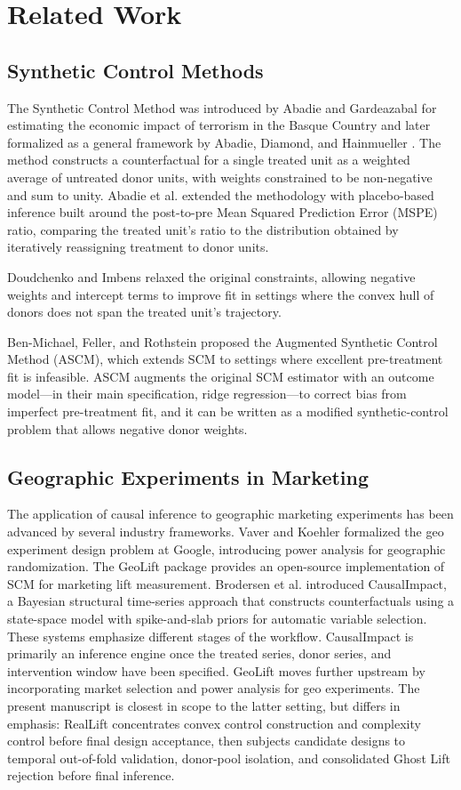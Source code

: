 \documentclass[11pt]{article}
\begin{document}
\section{Related Work}
\subsection{Synthetic Control Methods}
The Synthetic Control Method was introduced by Abadie and Gardeazabal \cite{ref1} for estimating the economic impact of terrorism in the Basque Country and later formalized as a general framework by Abadie, Diamond, and Hainmueller \cite{ref2}. The method constructs a counterfactual for a single treated unit as a weighted average of untreated donor units, with weights constrained to be non-negative and sum to unity. Abadie et al. \cite{ref3} extended the methodology with placebo-based inference built around the post-to-pre Mean Squared Prediction Error (MSPE) ratio, comparing the treated unit's ratio to the distribution obtained by iteratively reassigning treatment to donor units.

Doudchenko and Imbens \cite{ref7} relaxed the original constraints, allowing negative weights and intercept terms to improve fit in settings where the convex hull of donors does not span the treated unit's trajectory.

Ben-Michael, Feller, and Rothstein \cite{ref16} proposed the Augmented Synthetic Control Method (ASCM), which extends SCM to settings where excellent pre-treatment fit is infeasible. ASCM augments the original SCM estimator with an outcome model---in their main specification, ridge regression---to correct bias from imperfect pre-treatment fit, and it can be written as a modified synthetic-control problem that allows negative donor weights.

\subsection{Geographic Experiments in Marketing}
The application of causal inference to geographic marketing experiments has been advanced by several industry frameworks. Vaver and Koehler \cite{ref14} formalized the geo experiment design problem at Google, introducing power analysis for geographic randomization. The GeoLift package \cite{ref12} provides an open-source implementation of SCM for marketing lift measurement. Brodersen et al. \cite{ref6} introduced CausalImpact, a Bayesian structural time-series approach that constructs counterfactuals using a state-space model with spike-and-slab priors for automatic variable selection. These systems emphasize different stages of the workflow. CausalImpact is primarily an inference engine once the treated series, donor series, and intervention window have been specified. GeoLift moves further upstream by incorporating market selection and power analysis for geo experiments. The present manuscript is closest in scope to the latter setting, but differs in emphasis: RealLift concentrates convex control construction and complexity control before final design acceptance, then subjects candidate designs to temporal out-of-fold validation, donor-pool isolation, and consolidated Ghost Lift rejection before final inference.
\end{document}

